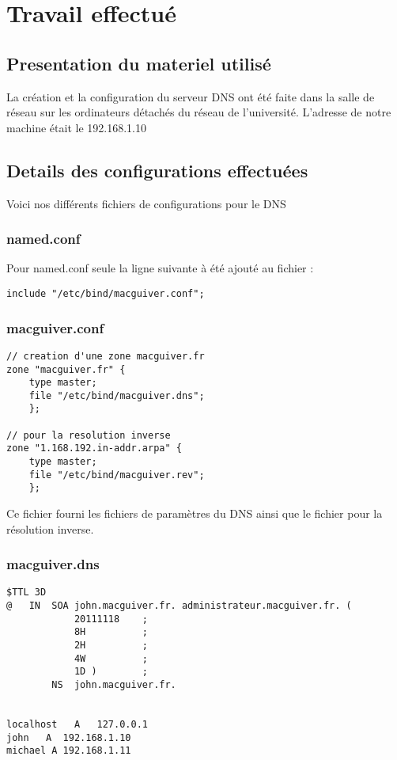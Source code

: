 \chapter{Travail effectué}

\section{Presentation du materiel utilisé}
La création et la configuration du serveur DNS ont été faite dans la salle de réseau sur les ordinateurs détachés du réseau de l'université. L'adresse de notre machine était le 192.168.1.10
\section{Details des configurations effectuées}
Voici nos différents fichiers de configurations pour le DNS
\subsection{named.conf}
Pour named.conf seule la ligne suivante à été ajouté au fichier :
\begin{verbatim}
include "/etc/bind/macguiver.conf";
\end{verbatim}
\subsection{macguiver.conf}
\begin{verbatim}
// creation d'une zone macguiver.fr
zone "macguiver.fr" {
    type master;   
    file "/etc/bind/macguiver.dns";
    };

// pour la resolution inverse
zone "1.168.192.in-addr.arpa" {
    type master;
    file "/etc/bind/macguiver.rev";
    };
 \end{verbatim}
 
 Ce fichier fourni les fichiers de paramètres du DNS ainsi que le fichier pour la résolution inverse.

\subsection{macguiver.dns}
\begin{verbatim}
$TTL 3D
@	IN	SOA	john.macguiver.fr. administrateur.macguiver.fr. (
			20111118    ;
			8H          ;
			2H          ;
			4W          ;
			1D )        ;
		NS	john.macguiver.fr.


localhost	A	127.0.0.1
john   A  192.168.1.10
michael A 192.168.1.11
\end{verbatim}

